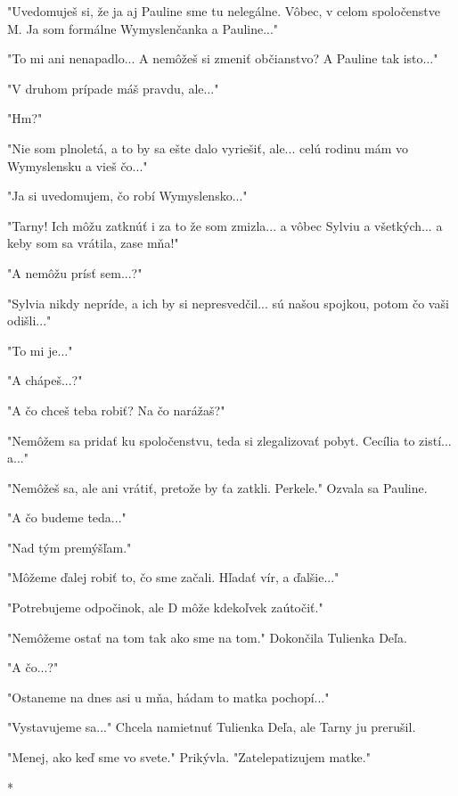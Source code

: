 \documentclass{book}
\begin{document}
"$ $Uvedomuješ si, že ja aj Pauline sme tu nelegálne. Vôbec, v celom spoločenstve M. Ja som formálne Wymyslenčanka a Pauline..."$ $ 

"$ $To mi ani nenapadlo... A nemôžeš si zmeniť občianstvo? A Pauline tak isto..."$ $ 

"$ $V druhom prípade máš pravdu, ale..."$ $ 

"$ $Hm?"$ $ 

"$ $Nie som plnoletá, a to by sa ešte dalo vyriešiť, ale... celú rodinu mám vo Wymyslensku a vieš čo..."$ $ 

"$ $Ja si uvedomujem, čo robí Wymyslensko..."$ $ 

"$ $Tarny! Ich môžu zatknúť i za to že som zmizla... a vôbec Sylviu a všetkých... a keby som sa vrátila, zase mňa!"$ $ 

"$ $A nemôžu prísť sem...?"$ $ 

"$ $Sylvia nikdy nepríde, a ich by si nepresvedčil... sú našou spojkou, potom čo vaši odišli..."$ $ 

"$ $To mi je..."$ $ 

"$ $A chápeš...?"$ $ 

"$ $A čo chceš teba robiť? Na čo narážaš?"$ $ 

"$ $Nemôžem sa pridať ku spoločenstvu, teda si zlegalizovať pobyt. Cecília to zistí... a..."$ $ 

"$ $Nemôžeš sa, ale ani vrátiť, pretože by ťa zatkli. Perkele."$ $  Ozvala sa Pauline.

"$ $A čo budeme teda..."$ $ 

"$ $Nad tým premýšľam."$ $ 

"$ $Môžeme ďalej robiť to, čo sme začali. Hľadať vír, a ďalšie..."$ $ 

"$ $Potrebujeme odpočinok, ale D môže kdekoľvek zaútočiť."$ $ 

"$ $Nemôžeme ostať na tom tak ako sme na tom."$ $  Dokončila Tulienka Deľa.

"$ $A čo...?"$ $ 

"$ $Ostaneme na dnes asi u mňa, hádam to matka pochopí..."$ $ 

"$ $Vystavujeme sa..."$ $  Chcela namietnuť Tulienka Deľa, ale Tarny ju prerušil.

"$ $Menej, ako keď sme vo svete."$ $  Prikývla. "$ $Zatelepatizujem matke."$ $ 

\begin{center}

*

\end{center}
\end{document}
